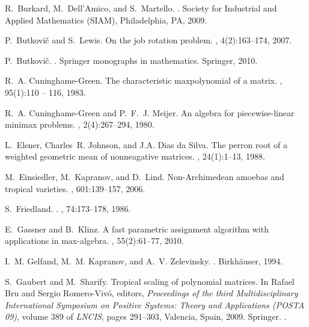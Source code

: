 \documentclass[a4paper]{amsart}
\theoremstyle{definition}
\theoremstyle{plain}
\theoremstyle{remark}
\begin{document}
\begin{thebibliography}{AKNR13}
R.~Burkard, M.~Dell'Amico, and S.~Martello.
.
\newblock Society for Industrial and Applied Mathematics (SIAM), Philadelphia,
  PA, 2009.

P.~Butkovi{\v{c}} and S.~Lewis.
\newblock On the job rotation problem.
, 4(2):163--174, 2007.

P.~Butkovi{\v{c}}.
.
\newblock Springer monographs in mathematics. Springer, 2010.

R.~A. Cuninghame-Green.
\newblock The characteristic maxpolynomial of a matrix.
, 95(1):110 --
  116, 1983.

R.~A. Cuninghame-Green and P.~F.~J. Meijer.
\newblock An algebra for piecewise-linear minimax problems.
, 2(4):267--294, 1980.

L.~Elsner, Charles~R. Johnson, and J.A. {Dias da Silva}.
\newblock The perron root of a weighted geometric mean of nonneagative
  matrices.
, 24(1):1--13, 1988.

M.~Einsiedler, M.~Kapranov, and D.~Lind.
\newblock Non-{A}rchimedean amoebas and tropical varieties.
, 601:139--157, 2006.

S.~Friedland.
.
, 74:173--178, 1986.

E.~Gassner and B.~Klinz.
\newblock A fast parametric assignment algorithm with applications in
  max-algebra.
, 55(2):61--77, 2010.

I.~M. Gelfand, M.~M. Kapranov, and A.~V. Zelevinsky.
.
\newblock Birkh\"auser, 1994.

S.~Gaubert and M.~Sharify.
\newblock Tropical scaling of polynomial matrices.
\newblock In Rafael Bru and Sergio Romero-Viv\'o, editors, {\em Proceedings of
  the third Multidisciplinary International Symposium on Positive Systems:
  Theory and Applications (POSTA 09)}, volume 389 of {\em LNCIS}, pages
  291--303, Valencia, Spain, 2009. Springer.
.


\end{thebibliography}
\end{document}
